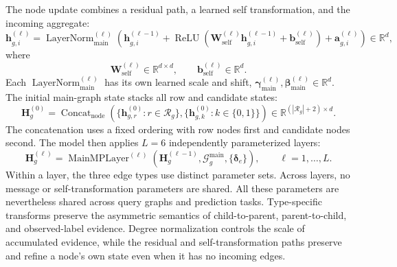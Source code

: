 \documentclass[11pt]{article}
\newcommand{\R}{\mathbb{R}}
\newcommand{\main}{\mathrm{main}}
\DeclareMathOperator{\ReLU}{ReLU}
\DeclareMathOperator{\LayerNorm}{LayerNorm}
\begin{document}
The node update combines a residual path, a learned self transformation,
and the incoming aggregate:
\begin{equation}
    \boxed{
    \mathbf h_{g,i}^{(\ell)}
    =
    \LayerNorm_{\main}^{(\ell)}
    \left(
        \mathbf h_{g,i}^{(\ell-1)}
        +
        \ReLU
        \left(
            \mathbf W_{\mathrm{self}}^{(\ell)}
            \mathbf h_{g,i}^{(\ell-1)}
            +
            \mathbf b_{\mathrm{self}}^{(\ell)}
        \right)
        +
        \mathbf a_{g,i}^{(\ell)}
    \right)
    }
    \in\R^d,
    \label{eq:main-update}
\end{equation}
where
\begin{equation}
    \mathbf W_{\mathrm{self}}^{(\ell)}\in\R^{d\times d},
    \qquad
    \mathbf b_{\mathrm{self}}^{(\ell)}\in\R^d.
    \label{eq:main-self-domains}
\end{equation}
Each \(\LayerNorm_{\main}^{(\ell)}\) has its own learned scale and shift,
\(\boldsymbol\gamma_{\main}^{(\ell)},
\boldsymbol\beta_{\main}^{(\ell)}\in\R^d\).  The initial main-graph state
stacks all row and candidate states:
\begin{equation}
    \mathbf H_g^{(0)}
    =
    \operatorname{Concat}_{\mathrm{node}}
    \left(
        \{\mathbf h_{g,r}^{(0)}:r\in\mathcal R_g\},
        \{\mathbf h_{g,k}^{(0)}:k\in\{0,1\}\}
    \right)
    \in\R^{(|\mathcal R_g|+2)\times d}.
    \label{eq:main-initial-matrix}
\end{equation}
The concatenation uses a fixed ordering with row nodes first and candidate
nodes second.
The model then applies \(L=6\) independently parameterized layers:
\begin{equation}
    \mathbf H_g^{(\ell)}
    =
    \operatorname{MainMPLayer}^{(\ell)}
    \left(
        \mathbf H_g^{(\ell-1)},
        \mathcal G_g^{\main},
        \{\boldsymbol\delta_e\}
    \right),
    \qquad
    \ell=1,\ldots,L.
    \label{eq:main-layer-stack}
\end{equation}
Within a layer, the three edge types use distinct parameter sets.  Across
layers, no message or self-transformation parameters are shared.  All these
parameters are nevertheless shared across query graphs and prediction
tasks.  Type-specific transforms preserve the asymmetric semantics of
child-to-parent, parent-to-child, and observed-label evidence.  Degree
normalization controls the scale of accumulated evidence, while the
residual and self-transformation paths preserve and refine a node's own
state even when it has no incoming edges.
\end{document}
